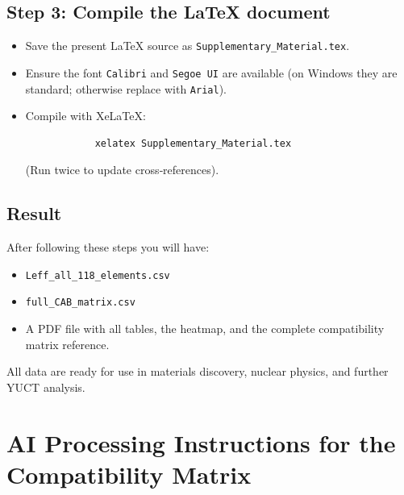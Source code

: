 \documentclass[11pt,a4paper]{article}
\begin{document}
	\subsection*{Step 3: Compile the LaTeX document}
	\begin{itemize}
		\item Save the present LaTeX source as \texttt{Supplementary\_Material.tex}.
		\item Ensure the font \texttt{Calibri} and \texttt{Segoe UI} are available (on Windows they are standard; otherwise replace with \texttt{Arial}).
		\item Compile with XeLaTeX: 
		\begin{verbatim}
			xelatex Supplementary_Material.tex
		\end{verbatim}
		(Run twice to update cross‑references).
	\end{itemize}
	
	\subsection*{Result}
	After following these steps you will have:
	\begin{itemize}
		\item \texttt{Leff\_all\_118\_elements.csv}
		\item \texttt{full\_CAB\_matrix.csv}
		\item A PDF file with all tables, the heatmap, and the complete compatibility matrix reference.
	\end{itemize}
	All data are ready for use in materials discovery, nuclear physics, and further YUCT analysis.
	
	\section*{AI Processing Instructions for the Compatibility Matrix}
	\label{sec:ai_instructions}
	
\end{document}
